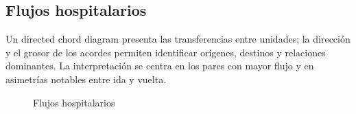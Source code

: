 \subsection{Flujos hospitalarios}
Un directed chord diagram \cite{chord} presenta las transferencias entre unidades; la dirección y el grosor de los acordes permiten identificar orígenes, destinos y relaciones dominantes. La interpretación se centra en los pares con mayor flujo y en asimetrías notables entre ida y vuelta.
\begin{figure}[H]
  \centering
  \caption{Flujos hospitalarios}
  \label{fig:chart-flows}
\end{figure}


